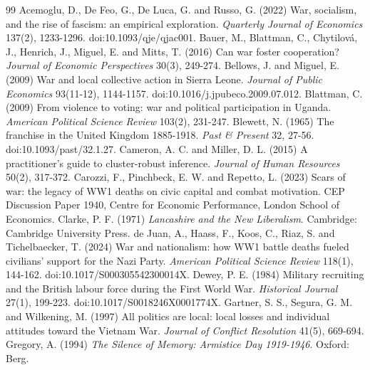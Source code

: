 \documentclass[11pt,a4paper]{article}
\begin{document}

\begin{thebibliography}{99}
 Acemoglu, D., De Feo, G., De Luca, G. and Russo, G. (2022) War, socialism, and the rise of fascism: an empirical exploration. \textit{Quarterly Journal of Economics} 137(2), 1233-1296. doi:10.1093/qje/qjac001.
 Bauer, M., Blattman, C., Chytilov\'a, J., Henrich, J., Miguel, E. and Mitts, T. (2016) Can war foster cooperation? \textit{Journal of Economic Perspectives} 30(3), 249-274.
 Bellows, J. and Miguel, E. (2009) War and local collective action in Sierra Leone. \textit{Journal of Public Economics} 93(11-12), 1144-1157. doi:10.1016/j.jpubeco.2009.07.012.
 Blattman, C. (2009) From violence to voting: war and political participation in Uganda. \textit{American Political Science Review} 103(2), 231-247.
 Blewett, N. (1965) The franchise in the United Kingdom 1885-1918. \textit{Past \& Present} 32, 27-56. doi:10.1093/past/32.1.27.
 Cameron, A. C. and Miller, D. L. (2015) A practitioner's guide to cluster-robust inference. \textit{Journal of Human Resources} 50(2), 317-372.
 Carozzi, F., Pinchbeck, E. W. and Repetto, L. (2023) Scars of war: the legacy of WW1 deaths on civic capital and combat motivation. CEP Discussion Paper 1940, Centre for Economic Performance, London School of Economics.
 Clarke, P. F. (1971) \textit{Lancashire and the New Liberalism}. Cambridge: Cambridge University Press.
 de Juan, A., Haass, F., Koos, C., Riaz, S. and Tichelbaecker, T. (2024) War and nationalism: how WW1 battle deaths fueled civilians' support for the Nazi Party. \textit{American Political Science Review} 118(1), 144-162. doi:10.1017/S000305542300014X.
 Dewey, P. E. (1984) Military recruiting and the British labour force during the First World War. \textit{Historical Journal} 27(1), 199-223. doi:10.1017/S0018246X0001774X.
 Gartner, S. S., Segura, G. M. and Wilkening, M. (1997) All politics are local: local losses and individual attitudes toward the Vietnam War. \textit{Journal of Conflict Resolution} 41(5), 669-694.
 Gregory, A. (1994) \textit{The Silence of Memory: Armistice Day 1919-1946}. Oxford: Berg.

\end{thebibliography}
\end{document}
